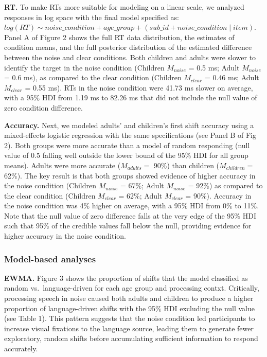 \documentclass[10pt, letterpaper]{article}
\begin{document}
\textbf{RT.} To make RTs more suitable for modeling on a linear scale,
we analyzed responses in log space with the final model specified as:
\texttt{$log(RT) \sim noise\_condition + age\_group + (sub\_id + noise\_condition \mid item)$}.
Panel A of Figure 2 shows the full RT data distribution, the estimates
of condition means, and the full posterior distribution of the estimated
difference between the noise and clear conditions. Both children and
adults were slower to identify the target in the noise condition
(Children \(M_{noise}\) = 0.5 ms; Adult \(M_{noise}\) = 0.6 ms), as
compared to the clear condition (Children \(M_{clear}\) = 0.46 ms; Adult
\(M_{clear}\) = 0.55 ms). RTs in the noise condition were 41.73 ms
slower on average, with a 95\% HDI from 1.19 ms to 82.26 ms that did not
include the null value of zero condition difference.

\textbf{Accuracy.} Next, we modeled adults' and children's first shift
accuracy using a mixed-effects logistic regression with the same
specifications (see Panel B of Fig 2). Both groups were more accurate
than a model of random responding (null value of \(0.5\) falling well
outside the lower bound of the 95\% HDI for all group means). Adults
were more accurate (\(M_{adults} =\) 90\%) than children
(\(M_{children} =\) 62\%). The key result is that both groups showed
evidence of higher accuracy in the noise condition (Children
\(M_{noise}\) = 67\%; Adult \(M_{noise}\) = 92\%) as compared to the
clear condition (Children \(M_{clear}\) = 62\%; Adult \(M_{clear}\) =
90\%). Accuracy in the noise condition was 4\% higher on average, with a
95\% HDI from 0\% to 11\%. Note that the null value of zero difference
falls at the very edge of the 95\% HDI such that 95\% of the credible
values fall below the null, providing evidence for higher accuracy in
the noise condition.

\subsubsection{Model-based analyses}\label{model-based-analyses}

\textbf{EWMA.} Figure 3 shows the proportion of shifts that the model
classified as random vs.~language-driven for each age group and
processing contxt. Critically, processing speech in noise caused both
adults and children to produce a higher proportion of language-driven
shifts with the 95\% HDI excluding the null value (see Table 1). This
pattern suggests that the noise condition led participants to increase
visual fixations to the language source, leading them to generate fewer
exploratory, random shifts before accumulating sufficient information to
respond accurately.
\end{document}
